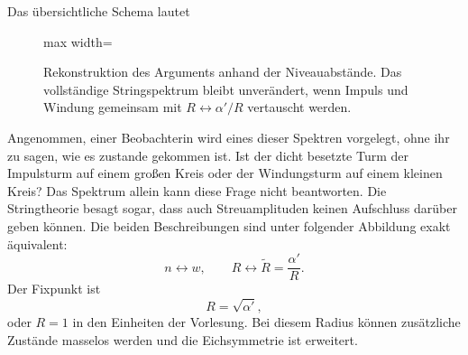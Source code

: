 Das übersichtliche Schema lautet
\begin{figure}[H]
  \centering
  \begin{adjustbox}{max width=\linewidth}
  \end{adjustbox}
  \caption{Rekonstruktion des Arguments anhand der Niveauabstände. Das vollständige Stringspektrum bleibt unverändert, wenn Impuls und Windung gemeinsam mit \(R\leftrightarrow\alpha'/R\) vertauscht werden.}
  \label{fig:l10-dual-spectra-redraw}
\end{figure}

Angenommen, einer Beobachterin wird eines dieser Spektren vorgelegt, ohne ihr zu sagen, wie es zustande gekommen ist. Ist der dicht besetzte Turm der Impulsturm auf einem großen Kreis oder der Windungsturm auf einem kleinen Kreis? Das Spektrum allein kann diese Frage nicht beantworten. Die Stringtheorie besagt sogar, dass auch Streuamplituden keinen Aufschluss darüber geben können. Die beiden Beschreibungen sind unter folgender Abbildung exakt äquivalent:
\begin{equation}
  n\longleftrightarrow w,
  \qquad
  R\longleftrightarrow \widetilde R=\frac{\alpha'}{R}.
  \label{eq:l10-radius-duality}
\end{equation}
Der Fixpunkt ist
\begin{equation}
  R=\sqrt{\alpha'},
  \label{eq:l10-self-dual-radius}
\end{equation}
oder \(R=1\) in den Einheiten der Vorlesung. Bei diesem Radius können zusätzliche Zustände masselos werden und die Eichsymmetrie ist erweitert.

